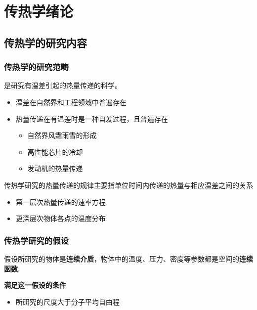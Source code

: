 
\chapter{传热学绪论}
\thispagestyle{empty}

\section{传热学的研究内容}

\subsection{传热学的研究范畴}
\noindent {}是研究有温差引起的热量传递的科学。
\begin{itemize}
	\item 温差在自然界和工程领域中普遍存在
	\item 热量传递在有温差时是一种自发过程，且普遍存在
	\begin{itemize}
		\item 自然界风霜雨雪的形成
		\item 高性能芯片的冷却
		\item 发动机的热量传递
	\end{itemize}
\end{itemize}

\noindent 传热学研究的热量传递的规律主要指单位时间内传递的热量与相应温差之间的关系
\begin{itemize}
	\item 第一层次\quad 热量传递的速率方程
	\item 更深层次\quad 物体各点的温度分布
\end{itemize}

\subsection{传热学研究的假设}

\tdefination[连续介质假设]
假设所研究的物体是\textbf{连续介质}，物体中的温度、压力、密度等参数都是空间的\textbf{连续函数}.\vspace*{0.5em}

\noindent \textbf{满足这一假设的条件}\vspace*{-0.5em}
\begin{itemize}
	\item 所研究的尺度大于分子平均自由程\vspace*{-0.5em}
\end{itemize}
 
